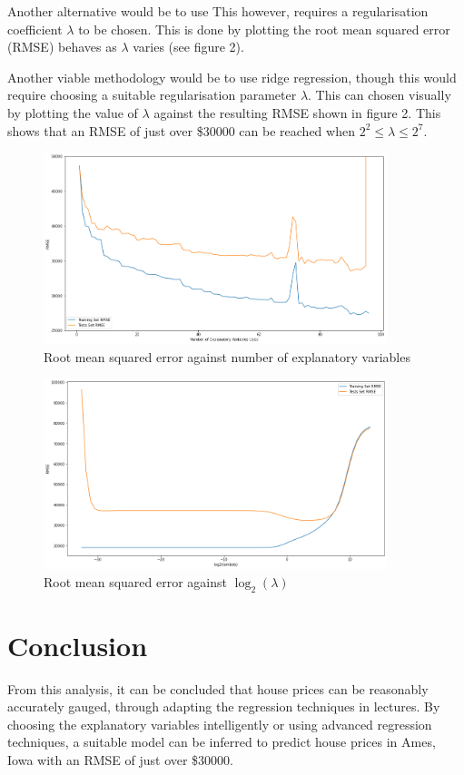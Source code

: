 \documentclass[10pt, letterpaper, twoside]{article}
\begin{document}
Another alternative would be to use This however, requires a regularisation coefficient $\lambda$ to be chosen. This is done by plotting the root mean squared error (RMSE) behaves as $\lambda$ varies (see figure 2).

Another viable methodology would be to use ridge regression, though this would require choosing a suitable regularisation parameter $\lambda$. This can chosen visually by plotting the value of $\lambda$ against the resulting RMSE shown in figure 2. This shows that an RMSE of just over \$30000 can be reached when $2^2 \leq \lambda \leq 2^7$.

\begin{figure}[h]
\includegraphics[width=10cm]{corr1}
\centering
\caption{Root mean squared error against number of explanatory variables}
\end{figure}

\begin{figure}[h]
\includegraphics[width=10cm]{ridge}
\centering
\caption{Root mean squared error against $\log_2(\lambda)$}
\end{figure}

\section{Conclusion}

From this analysis, it can be concluded that house prices can be reasonably accurately gauged, through adapting the regression techniques in lectures. By choosing the explanatory variables intelligently or using advanced regression techniques, a suitable model can be inferred to predict house prices in Ames, Iowa with an RMSE of just over \$30000.
\end{document}
